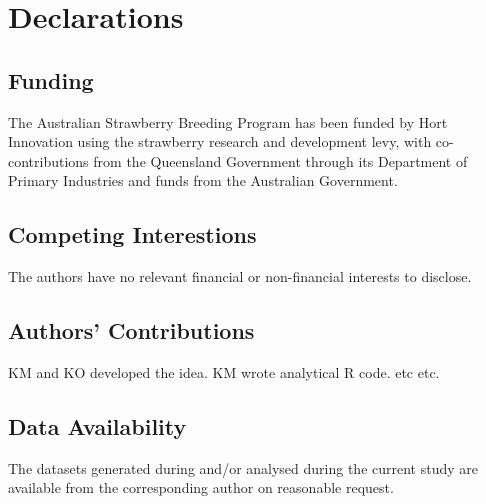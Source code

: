 \documentclass[sn-basic,pdflatex]{sn-jnl}
\theoremstyle{remark}
\theoremstyle{definition}
\begin{document}
\section*{Declarations}\label{declarations}

\subsection{Funding}\label{funding}

The Australian Strawberry Breeding Program has been funded by Hort Innovation using the strawberry research and development levy, with co-contributions from the Queensland Government through its Department of Primary Industries and funds from the Australian Government.

\subsection{Competing Interestions}\label{competing-interestions}

The authors have no relevant financial or non-financial interests to disclose.

\subsection{Authors' Contributions}\label{authors-contributions}

KM and KO developed the idea. KM wrote analytical R code. etc etc.

\subsection{Data Availability}\label{data-availability}

The datasets generated during and/or analysed during the current study are available from the corresponding author on reasonable request.


\end{document}
